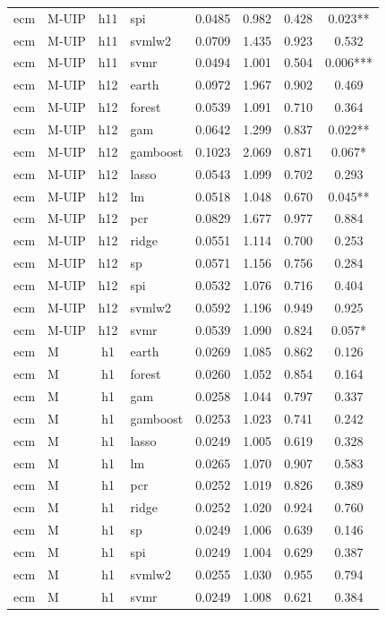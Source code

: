 \begin{ThreePartTable}
\begin{longtable}[t]{llclcccc}
ecm & M-UIP & h11 & spi & 0.0485 & 0.982 & 0.428 & 0.023**\\
ecm & M-UIP & h11 & svmlw2 & 0.0709 & 1.435 & 0.923 & 0.532\\
ecm & M-UIP & h11 & svmr & 0.0494 & 1.001 & 0.504 & 0.006***\\
\addlinespace
ecm & M-UIP & h12 & earth & 0.0972 & 1.967 & 0.902 & 0.469\\
ecm & M-UIP & h12 & forest & 0.0539 & 1.091 & 0.710 & 0.364\\
ecm & M-UIP & h12 & gam & 0.0642 & 1.299 & 0.837 & 0.022**\\
ecm & M-UIP & h12 & gamboost & 0.1023 & 2.069 & 0.871 & 0.067*\\
ecm & M-UIP & h12 & lasso & 0.0543 & 1.099 & 0.702 & 0.293\\
ecm & M-UIP & h12 & lm & 0.0518 & 1.048 & 0.670 & 0.045**\\
ecm & M-UIP & h12 & pcr & 0.0829 & 1.677 & 0.977 & 0.884\\
ecm & M-UIP & h12 & ridge & 0.0551 & 1.114 & 0.700 & 0.253\\
ecm & M-UIP & h12 & sp & 0.0571 & 1.156 & 0.756 & 0.284\\
ecm & M-UIP & h12 & spi & 0.0532 & 1.076 & 0.716 & 0.404\\
ecm & M-UIP & h12 & svmlw2 & 0.0592 & 1.196 & 0.949 & 0.925\\
ecm & M-UIP & h12 & svmr & 0.0539 & 1.090 & 0.824 & 0.057*\\
\addlinespace
ecm & M & h1 & earth & 0.0269 & 1.085 & 0.862 & 0.126\\
ecm & M & h1 & forest & 0.0260 & 1.052 & 0.854 & 0.164\\
ecm & M & h1 & gam & 0.0258 & 1.044 & 0.797 & 0.337\\
ecm & M & h1 & gamboost & 0.0253 & 1.023 & 0.741 & 0.242\\
ecm & M & h1 & lasso & 0.0249 & 1.005 & 0.619 & 0.328\\
ecm & M & h1 & lm & 0.0265 & 1.070 & 0.907 & 0.583\\
ecm & M & h1 & pcr & 0.0252 & 1.019 & 0.826 & 0.389\\
ecm & M & h1 & ridge & 0.0252 & 1.020 & 0.924 & 0.760\\
ecm & M & h1 & sp & 0.0249 & 1.006 & 0.639 & 0.146\\
ecm & M & h1 & spi & 0.0249 & 1.004 & 0.629 & 0.387\\
ecm & M & h1 & svmlw2 & 0.0255 & 1.030 & 0.955 & 0.794\\
ecm & M & h1 & svmr & 0.0249 & 1.008 & 0.621 & 0.384\\

\end{longtable}
\end{ThreePartTable}
